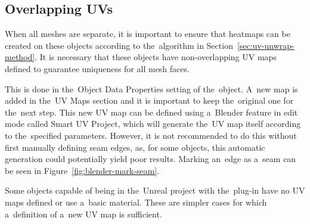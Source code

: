 \subsection{Overlapping UVs}
When all meshes are separate, it is important to ensure that heatmaps can be created on these objects according to the~algorithm in Section~\ref{sec:uv-unwrap-method}. It is necessary that these objects have non-overlapping UV maps defined to guarantee uniqueness for all mesh faces.

This is done in the~Object Data Properties setting of the~object. A~new map is added in the~UV Maps section and it is important to keep the~original one for the~next step. This new UV map can be defined using a~Blender feature in edit mode called Smart UV Project, which will generate the~UV map itself according to the~specified parameters. However, it is not recommended to do this without first manually defining seam edges, as, for some objects, this automatic generation could potentially yield poor results. Marking an~edge as a~seam can be seen in Figure~\ref{fig:blender-mark-seam}.

Some objects capable of being in the~Unreal project with the~plug-in have no UV maps defined or use a~basic material. These are simpler cases for which a~definition of a~new UV map is sufficient. 

